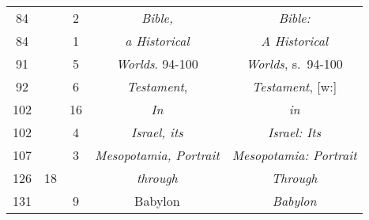 \documentclass[a4paper,11pt]{article}
\begin{document}
\begin{center}
\begin{tabular}{|c|c|c|c|c|}
    84  & & \hphantom{0}2 & \textit{Bible,} & \textit{Bible:} \\
    84  & & \hphantom{0}1 & \textit{a Historical} & \textit{A Historical} \\
    91  & & \hphantom{0}5 & \textit{Worlds}. 94-100
    & \textit{Worlds}, s.~94-100 \\
    92  & & \hphantom{0}6 & \textit{Testament},
    & \textit{Testament}, [w:] \\
    102 & & 16 & \textit{In} & \textit{in} \\
    102 & & \hphantom{0}4 & \textit{Israel, its} & \textit{Israel: Its} \\
    107 & & \hphantom{0}3 & \textit{Mesopotamia, Portrait}
           & \textit{Mesopotamia: Portrait} \\
    126 & 18 & & \textit{through} & \textit{Through} \\
    131 & & \hphantom{0}9 & Babylon & \textit{Babylon} \\
    \hline
  \end{tabular}






\end{center}
\end{document}
